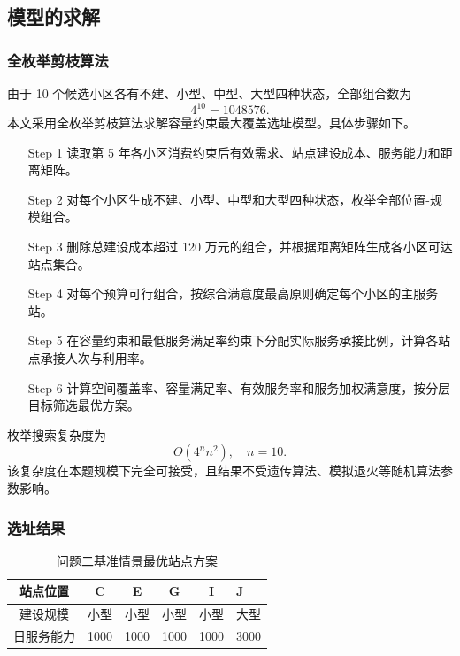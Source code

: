 \subsection{模型的求解}

\subsubsection{全枚举剪枝算法}

由于 10 个候选小区各有不建、小型、中型、大型四种状态，全部组合数为
\begin{equation}
4^{10}=1048576.
\end{equation}
本文采用全枚举剪枝算法求解容量约束最大覆盖选址模型。具体步骤如下。

\begin{enumerate}
    \item[Step 1] 读取第 5 年各小区消费约束后有效需求、站点建设成本、服务能力和距离矩阵。
    \item[Step 2] 对每个小区生成不建、小型、中型和大型四种状态，枚举全部位置-规模组合。
    \item[Step 3] 删除总建设成本超过 120 万元的组合，并根据距离矩阵生成各小区可达站点集合。
    \item[Step 4] 对每个预算可行组合，按综合满意度最高原则确定每个小区的主服务站。
    \item[Step 5] 在容量约束和最低服务满足率约束下分配实际服务承接比例，计算各站点承接人次与利用率。
    \item[Step 6] 计算空间覆盖率、容量满足率、有效服务率和服务加权满意度，按分层目标筛选最优方案。
\end{enumerate}

枚举搜索复杂度为
\begin{equation}
O(4^n n^2),\quad n=10.
\end{equation}
该复杂度在本题规模下完全可接受，且结果不受遗传算法、模拟退火等随机算法参数影响。

\subsubsection{选址结果}

\begin{table}[H]
\centering
\caption{问题二基准情景最优站点方案}
\label{tab:p2_result}
\begin{tabular}{c c c c c}
\toprule
站点位置 & C & E & G & I & J \\
\midrule
建设规模 & 小型 & 小型 & 小型 & 小型 & 大型 \\
日服务能力 & 1000 & 1000 & 1000 & 1000 & 3000 \\
\bottomrule
\end{tabular}
\end{table}

